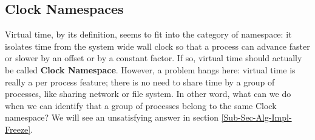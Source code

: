 \documentclass{acm_proc_article-sp}
\begin{document}
\subsection{Clock Namespaces}
Virtual time, by its definition, seems to fit into the category of namespace: it isolates time from the system wide wall clock so that a process can advance faster or slower by an offset or by a constant factor. 
If so, virtual time should actually be called \textbf{Clock Namespace}. However, a problem hangs here: virtual time is really a per process feature; there is no need to share time by a group of processes, like sharing network or file system. 
In other word, what can we do when we can identify that a group of processes belong to the same Clock namespace? We will see an unsatisfying answer in section \ref{Sub-Sec-Alg-Impl-Freeze}.
\end{document}
